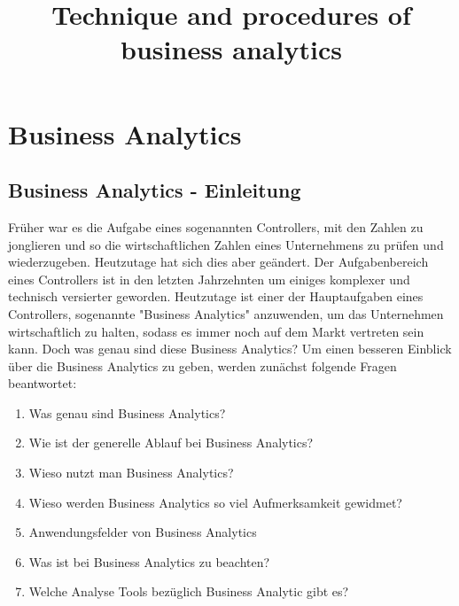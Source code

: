 \documentclass[12pt,twocolumn,twoside]{conference}   %
\title{Technique and procedures of business analytics}
\author{}
\begin{document}

\section{Business Analytics}
\subsection{Business Analytics - Einleitung}
Früher war es die Aufgabe eines sogenannten Controllers, mit den Zahlen zu jonglieren und so die wirtschaftlichen Zahlen eines Unternehmens zu prüfen und wiederzugeben. Heutzutage hat sich dies aber geändert. Der Aufgabenbereich eines Controllers ist in den letzten Jahrzehnten um einiges komplexer und technisch versierter geworden. Heutzutage ist einer der Hauptaufgaben eines Controllers, sogenannte "Business Analytics" anzuwenden, um das Unternehmen wirtschaftlich zu halten, sodass es immer noch auf dem Markt vertreten sein kann. Doch was genau sind diese Business Analytics?
Um einen besseren Einblick über die Business Analytics zu geben, werden zunächst folgende Fragen beantwortet: 

\begin{enumerate}
\item Was genau sind Business Analytics?
\item Wie ist der generelle Ablauf bei Business Analytics?
\item Wieso nutzt man Business Analytics?
\item Wieso werden Business Analytics so viel Aufmerksamkeit gewidmet?
\item Anwendungsfelder von Business Analytics
\item Was ist bei Business Analytics zu beachten?
\item Welche Analyse Tools bezüglich Business Analytic gibt es?
\end{enumerate}
\end{document}
